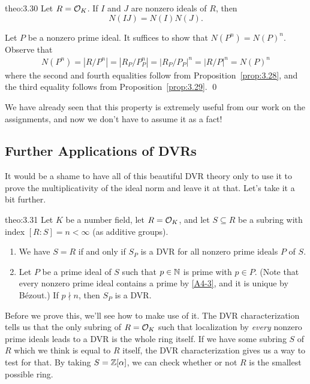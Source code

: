 \begin{theo}{theo:3.30}
    Let $R = {\cal O}_K$. If $I$ and $J$ are nonzero ideals of $R$, then 
    \[ N(IJ) = N(I) N(J). \] 
\end{theo}\vspace{-0.25cm}
\begin{pf}
    Let $P$ be a nonzero prime ideal. It suffices to show that $N(P^n) = N(P)^n$.
    Observe that 
    \begin{align*}
        N(P^n) = |R/P^n| 
        = |R_P/P_P^n|  
        = |R_P/P_P|^n 
        = |R/P|^n  
        = N(P)^n
    \end{align*}
    where the second and fourth equalities follow from Proposition~\ref{prop:3.28},
    and the third equality follows from Proposition~\ref{prop:3.29}. \qed 
\end{pf}\vspace{-0.25cm}

We have already seen that this property is extremely useful from our work on 
the assignments, and now we don't have to assume it as a fact!

\subsection{Further Applications of DVRs} \label{subsec:3.8}
It would be a shame to have all of this beautiful DVR theory only to 
use it to prove the multiplicativity of the ideal norm and leave it 
at that. Let's take it a bit further. 

\begin{theo}{theo:3.31}
    Let $K$ be a number field, let $R = {\cal O}_K$, and let $S \subseteq R$ 
    be a subring with index $[R : S] = n < \infty$ (as additive groups).
    \begin{enumerate}[(1)]
        \item We have $S = R$ if and only if $S_P$ is a DVR for all 
        nonzero prime ideals $P$ of $S$. 
        \item Let $P$ be a prime ideal of $S$ such that $p \in \mathbb{N}$ is prime 
        with $p \in P$. (Note that every nonzero prime ideal contains 
        a prime by \ref{A4-3}, and it is unique by B\'ezout.) If $p \nmid n$, 
        then $S_P$ is a DVR. 
    \end{enumerate}
\end{theo}\vspace{-0.25cm}
Before we prove this, we'll see how to make use of it. The 
DVR characterization tells us that the only subring of $R = {\cal O}_K$ 
such that localization by \emph{every} nonzero prime ideals leads to a DVR is the whole ring itself. 
If we have some subring $S$ of $R$ which we think is equal to $R$ itself, 
the DVR characterization gives us a way to test for that. By taking $S = 
\mathbb{Z}[\alpha]$, we can check whether or not $R$ is the smallest possible ring. 


